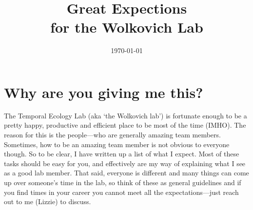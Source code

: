 \documentclass[11pt,a4paper,oneside]{article}
\begin{document}



\title{Great Expections\\ for the Wolkovich Lab}
\date{\today}
\maketitle

\section{Why are you giving me this?}
The Temporal Ecology Lab (aka `the Wolkovich lab') is fortunate enough to be a pretty happy, productive and efficient place to be most of the time (IMHO). The reason for this is the people---who are generally amazing team members. \\

\noindent Sometimes, how to be an amazing team member is not obvious to everyone though. So to be clear, I have written up a list of what I expect. Most of these tasks should be easy for you, and effectively are my way of explaining what I see as a good lab member. That said, everyone is different and many things can come up over someone's time in the lab, so think of these as general guidelines and if you find times in your career you cannot meet all the expectations---just reach out to me (Lizzie) to discuss. 
\end{document}
